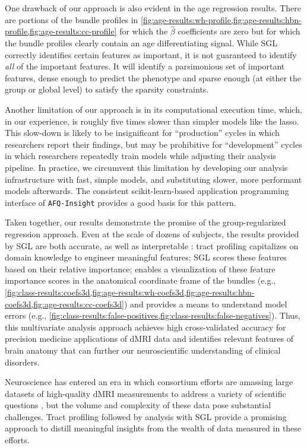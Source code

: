 \documentclass[10pt,letterpaper]{article}
\begin{document}
One drawback of our approach is also evident in the age regression results.
There are portions of the bundle profiles in
\cref{fig:age-results:wh-profile,fig:age-results:hbn-profile,fig:age-results:cc-profile}
for which the $\hat{\beta}$ coefficients are zero but for which the bundle
profiles clearly contain an age differentiating signal. While SGL correctly
identifies certain features as important, it is not guaranteed to identify
\emph{all} of the important features. It will identify a parsimonious set of
important features, dense enough to predict the phenotype and sparse enough
(at either the group or global level) to satisfy the sparsity constraints.

Another limitation of our approach is in its computational execution time, which, in our experience, is roughly five times slower than simpler models like the lasso. This slow-down is likely to be insignificant for ``production'' cycles in which researchers report their findings, but may be prohibitive for ``development'' cycles in which researchers repeatedly train models while adjusting their analysis pipeline. In practice, we circumvent this limitation by developing our analysis infrastructure with fast, simple models, and substituting slower, more performant models afterwards. The consistent scikit-learn-based application programming interface of \texttt{AFQ-Insight} provides a good basis for this pattern.

Taken together, our results demonstrate the promise of the
group-regularized regression approach. Even at the scale of dozens of
subjects, the results provided by SGL are both accurate, as well as
interpretable \cite{Murdoch2019-ax}: tract profiling capitalizes on domain
knowledge to engineer meaningful features; SGL scores these features based on
their relative importance; enables a visualization of these feature
importance scores in the anatomical coordinate frame of the bundles (e.g.,
\cref{fig:class-results:coefs3d,fig:age-results:wh-coefs3d,fig:age-results:hbn-coefs3d,fig:age-results:cc-coefs3d})
and provides a means to understand model errors (e.g.,
\cref{fig:class-results:false-positives,fig:class-results:false-negatives}).
Thus, this multivariate analysis approach achieves high cross-validated
accuracy for precision medicine applications of dMRI data and identifies
relevant features of brain anatomy that can further our neuroscientific
understanding of clinical disorders.

Neuroscience has entered an era in which consortium efforts are amassing
large datasets of high-quality dMRI measurements to address a variety of
scientific questions \cite{jernigan2016ping, jernigan2018abcd,
alexander2017open, Miller2016-hw, VanEssen2012}, but the volume and
complexity of these data pose substantial challenges.
Tract profiling followed by
analysis with SGL provide a promising approach to distill meaningful insights
from the wealth of data measured in these efforts.
\end{document}
